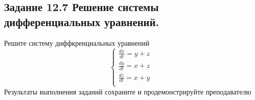 \subsection*{\textbf{Задание 12.7} Решение системы дифференциальных уравнений.}
Решите систему диффкренциальных уравнений
\[
    \begin{cases}
        \frac{dx}{dt} = y + z \\
        \frac{dy}{dt} = x + z \\
        \frac{dz}{dt} = x + y \\
    \end{cases}
\]
Результаты выполнения заданий сохраните и продемонстрируйте преподавателю

\begin{figure}[H]
    \renewcommand{\figurename}{Рисунок}
    \label{fig:image_12_7}
\end{figure}